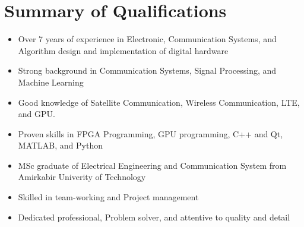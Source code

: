 \section{Summary of Qualifications}

		\begin{itemize}
            \setlength\itemsep{0em}
			\item Over 7 years of experience in Electronic, Communication Systems, and Algorithm design and implementation of digital hardware
			\item Strong background in Communication Systems, Signal Processing, and Machine Learning
   		\item Good knowledge of Satellite Communication, Wireless Communication, LTE, and GPU.
 			\item Proven skills in FPGA Programming, GPU programming, C++ and Qt, MATLAB, and Python
			\item MSc graduate of Electrical Engineering and Communication System from Amirkabir Univerity of Technology
			\item Skilled in team-working and Project management
			\item Dedicated professional, Problem solver, and  attentive to quality and detail
			\end{itemize}
